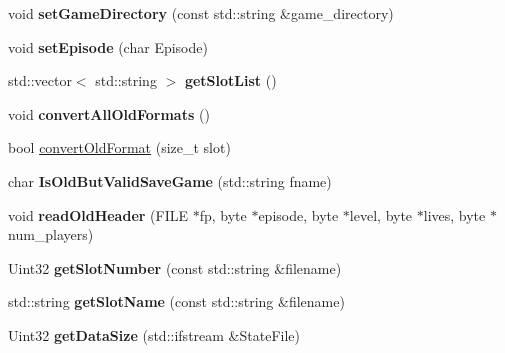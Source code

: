 \begin{DoxyCompactItemize}
\item 
\hypertarget{class_c_saved_game_a55c6d0b01da494434d4ed4990117904d}{
void {\bfseries setGameDirectory} (const std::string \&game\_\-directory)}
\label{class_c_saved_game_a55c6d0b01da494434d4ed4990117904d}

\item 
\hypertarget{class_c_saved_game_a992a6f09c03da1515d316f4aabfbd166}{
void {\bfseries setEpisode} (char Episode)}
\label{class_c_saved_game_a992a6f09c03da1515d316f4aabfbd166}

\item 
\hypertarget{class_c_saved_game_a4b4af8c4da4b30052dd48db65648ad31}{
std::vector$<$ std::string $>$ {\bfseries getSlotList} ()}
\label{class_c_saved_game_a4b4af8c4da4b30052dd48db65648ad31}

\item 
\hypertarget{class_c_saved_game_a1c7fd2f7997b10b868251d4840fc1dd3}{
void {\bfseries convertAllOldFormats} ()}
\label{class_c_saved_game_a1c7fd2f7997b10b868251d4840fc1dd3}

\item 
bool \hyperlink{class_c_saved_game_aad40f2904291eb28ff7bb516b1bf272d}{convertOldFormat} (size\_\-t slot)
\item 
\hypertarget{class_c_saved_game_ab88eccf9bf9121dc7f68d972e548004f}{
char {\bfseries IsOldButValidSaveGame} (std::string fname)}
\label{class_c_saved_game_ab88eccf9bf9121dc7f68d972e548004f}

\item 
\hypertarget{class_c_saved_game_ad05baee5bbc600aba95072496d47d340}{
void {\bfseries readOldHeader} (FILE $\ast$fp, byte $\ast$episode, byte $\ast$level, byte $\ast$lives, byte $\ast$num\_\-players)}
\label{class_c_saved_game_ad05baee5bbc600aba95072496d47d340}

\item 
\hypertarget{class_c_saved_game_a6e2b0f733a191da41a0344b5c8f56bb4}{
Uint32 {\bfseries getSlotNumber} (const std::string \&filename)}
\label{class_c_saved_game_a6e2b0f733a191da41a0344b5c8f56bb4}

\item 
\hypertarget{class_c_saved_game_afe950c724bf9ba24ff1f7615302f6658}{
std::string {\bfseries getSlotName} (const std::string \&filename)}
\label{class_c_saved_game_afe950c724bf9ba24ff1f7615302f6658}

\item 
\hypertarget{class_c_saved_game_af2bcc79fa5dc296219776053965c9696}{
Uint32 {\bfseries getDataSize} (std::ifstream \&StateFile)}
\label{class_c_saved_game_af2bcc79fa5dc296219776053965c9696}


\end{DoxyCompactItemize}
